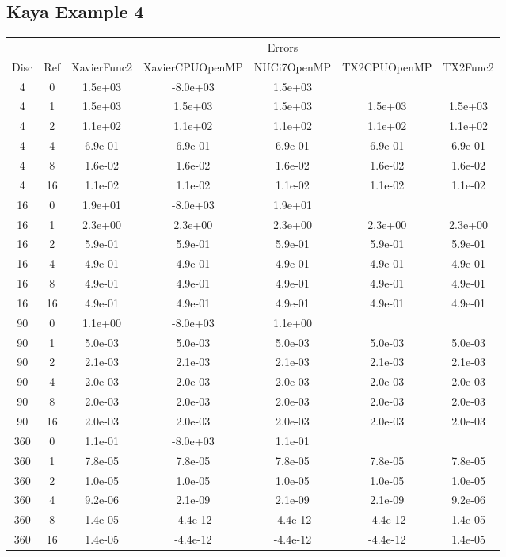 \subsection{Kaya Example 4}
\begin{center}
\begin{tabular}{c|c|c|c|c|c|c}
	&&\multicolumn{5}{c}{Errors}\\
	Disc&Ref&XavierFunc2&XavierCPUOpenMP&NUCi7OpenMP&TX2CPUOpenMP&TX2Func2\\
\hline
4&0&1.5e+03&-8.0e+03&1.5e+03\\
4&1&1.5e+03&1.5e+03&1.5e+03&1.5e+03&1.5e+03\\
4&2&1.1e+02&1.1e+02&1.1e+02&1.1e+02&1.1e+02\\
4&4&6.9e-01&6.9e-01&6.9e-01&6.9e-01&6.9e-01\\
4&8&1.6e-02&1.6e-02&1.6e-02&1.6e-02&1.6e-02\\
4&16&1.1e-02&1.1e-02&1.1e-02&1.1e-02&1.1e-02\\
\hline
16&0&1.9e+01&-8.0e+03&1.9e+01\\
16&1&2.3e+00&2.3e+00&2.3e+00&2.3e+00&2.3e+00\\
16&2&5.9e-01&5.9e-01&5.9e-01&5.9e-01&5.9e-01\\
16&4&4.9e-01&4.9e-01&4.9e-01&4.9e-01&4.9e-01\\
16&8&4.9e-01&4.9e-01&4.9e-01&4.9e-01&4.9e-01\\
16&16&4.9e-01&4.9e-01&4.9e-01&4.9e-01&4.9e-01\\
\hline
90&0&1.1e+00&-8.0e+03&1.1e+00\\
90&1&5.0e-03&5.0e-03&5.0e-03&5.0e-03&5.0e-03\\
90&2&2.1e-03&2.1e-03&2.1e-03&2.1e-03&2.1e-03\\
90&4&2.0e-03&2.0e-03&2.0e-03&2.0e-03&2.0e-03\\
90&8&2.0e-03&2.0e-03&2.0e-03&2.0e-03&2.0e-03\\
90&16&2.0e-03&2.0e-03&2.0e-03&2.0e-03&2.0e-03\\
\hline
360&0&1.1e-01&-8.0e+03&1.1e-01\\
360&1&7.8e-05&7.8e-05&7.8e-05&7.8e-05&7.8e-05\\
360&2&1.0e-05&1.0e-05&1.0e-05&1.0e-05&1.0e-05\\
360&4&9.2e-06&2.1e-09&2.1e-09&2.1e-09&9.2e-06\\
360&8&1.4e-05&-4.4e-12&-4.4e-12&-4.4e-12&1.4e-05\\
360&16&1.4e-05&-4.4e-12&-4.4e-12&-4.4e-12&1.4e-05\\
\hline
\end{tabular}
\end{center}







